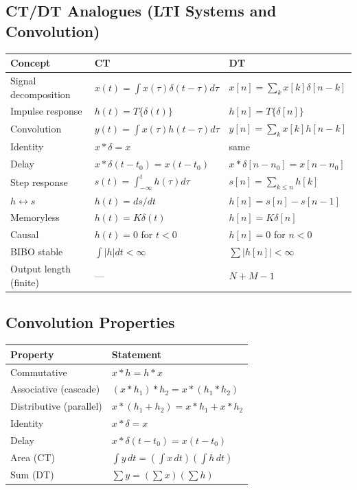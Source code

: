 \documentclass[11pt]{article}
\newcommand{\Conv}{\ast}
\begin{document}
\subsection{CT/DT Analogues (LTI Systems and Convolution)}
\begin{center}
\begin{tabular}{|l|l|l|}
\hline
Concept & CT & DT\\
\hline
Signal decomposition & $x(t)=\int x(\tau)\delta(t-\tau)d\tau$ & $x[n]=\sum_k x[k]\delta[n-k]$\\
Impulse response & $h(t)=T\{\delta(t)\}$ & $h[n]=T\{\delta[n]\}$\\
Convolution & $y(t)=\int x(\tau)h(t-\tau)d\tau$ & $y[n]=\sum_k x[k]h[n-k]$\\
Identity & $x\Conv\delta = x$ & same\\
Delay & $x\Conv\delta(t-t_0)=x(t-t_0)$ & $x\Conv\delta[n-n_0]=x[n-n_0]$\\
Step response & $s(t)=\int_{-\infty}^t h(\tau)d\tau$ & $s[n]=\sum_{k\le n}h[k]$\\
$h\leftrightarrow s$ & $h(t)=ds/dt$ & $h[n]=s[n]-s[n-1]$\\
Memoryless & $h(t)=K\delta(t)$ & $h[n]=K\delta[n]$\\
Causal & $h(t)=0$ for $t<0$ & $h[n]=0$ for $n<0$\\
BIBO stable & $\int|h|dt<\infty$ & $\sum|h[n]|<\infty$\\
Output length (finite) & --- & $N+M-1$\\
\hline
\end{tabular}
\end{center}

\subsection{Convolution Properties}
\begin{center}
\begin{tabular}{|l|l|}
\hline
Property & Statement\\
\hline
Commutative & $x\Conv h = h\Conv x$\\
Associative (cascade) & $(x\Conv h_1)\Conv h_2 = x\Conv(h_1\Conv h_2)$\\
Distributive (parallel) & $x\Conv(h_1+h_2)=x\Conv h_1 + x\Conv h_2$\\
Identity & $x\Conv\delta = x$\\
Delay & $x\Conv\delta(t-t_0) = x(t-t_0)$\\
Area (CT) & $\int y\,dt = (\int x\,dt)(\int h\,dt)$\\
Sum (DT) & $\sum y = (\sum x)(\sum h)$\\
\hline
\end{tabular}
\end{center}
\end{document}

